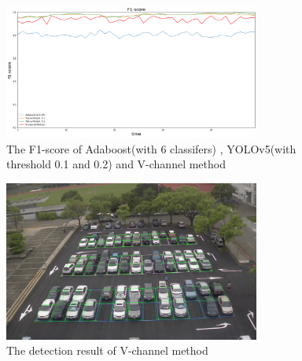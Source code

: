 \documentclass{article}[12pt]
\begin{document}
\begin{figure}[H]
    \centering
    \includegraphics[width=0.75\textwidth]{figure/F1-score_v.png}
    \caption{The F1-score of Adaboost(with 6 classifers)
    , YOLOv5(with threshold 0.1 and 0.2) and V-channel method}
\end{figure}

\begin{figure}[H]
    \centering
    \includegraphics[width=0.75\textwidth]{figure/CV_first_frame.png}
    \caption{The detection result of V-channel method}
\end{figure}
\end{document}
